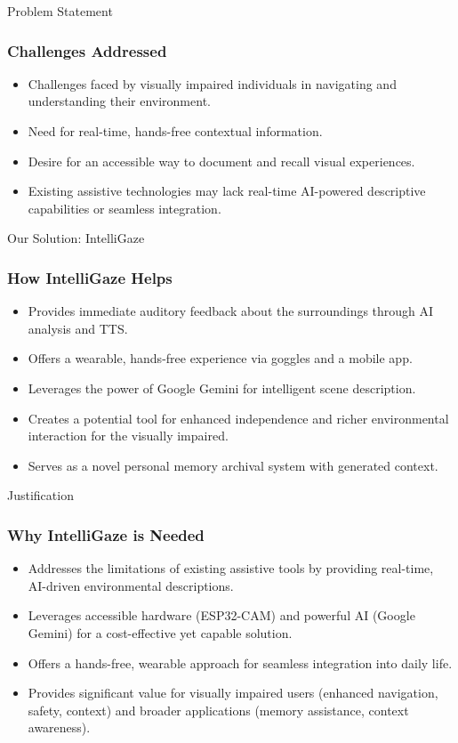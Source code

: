 \documentclass{beamer}
\begin{document}
\begin{frame}{Problem Statement}
  \frametitle{Challenges Addressed}
  \begin{itemize}
    \item Challenges faced by visually impaired individuals in navigating and understanding their environment.
    \item Need for real-time, hands-free contextual information.
    \item Desire for an accessible way to document and recall visual experiences.
    \item Existing assistive technologies may lack real-time AI-powered descriptive capabilities or seamless integration.
  \end{itemize}
\end{frame}

\begin{frame}{Our Solution: IntelliGaze}
  \frametitle{How IntelliGaze Helps}
  \begin{itemize}
    \item Provides immediate auditory feedback about the surroundings through AI analysis and TTS.
    \item Offers a wearable, hands-free experience via goggles and a mobile app.
    \item Leverages the power of Google Gemini for intelligent scene description.
    \item Creates a potential tool for enhanced independence and richer environmental interaction for the visually impaired.
    \item Serves as a novel personal memory archival system with generated context.
  \end{itemize}
\end{frame}

\begin{frame}{Justification}
  \frametitle{Why IntelliGaze is Needed}
  \begin{itemize}
    \item Addresses the limitations of existing assistive tools by providing real-time, AI-driven environmental descriptions.
    \item Leverages accessible hardware (ESP32-CAM) and powerful AI (Google Gemini) for a cost-effective yet capable solution.
    \item Offers a hands-free, wearable approach for seamless integration into daily life.
    \item Provides significant value for visually impaired users (enhanced navigation, safety, context) and broader applications (memory assistance, context awareness).
  \end{itemize}
\end{frame}
\end{document}
